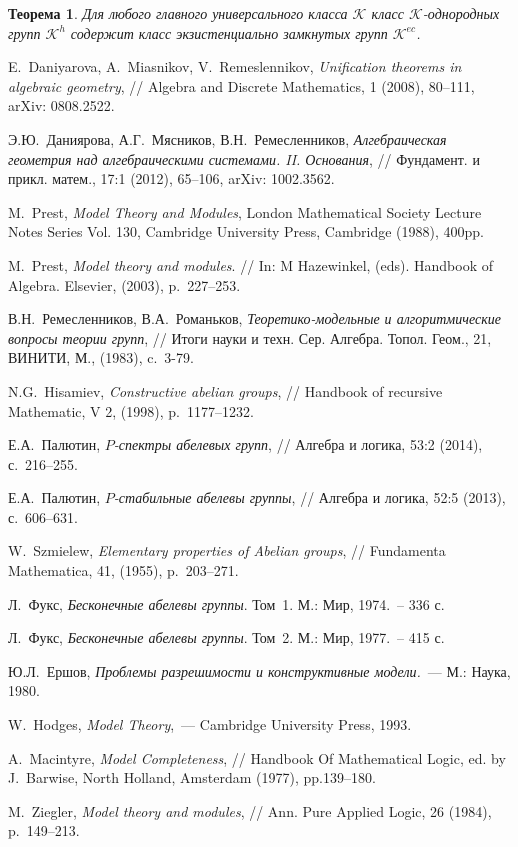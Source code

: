 \documentclass[12pt]{extarticle} %
\newtheorem{theorem}{Теорема}[section]
\def\K{{\mathcal{K}}}
\def\Kec{\mathcal{K}^{ec}}
\def\Kh{\mathcal{K}^{h}}
\begin{document}
\begin{theorem}
Для любого главного универсального класса $\K$ класс $\K$-однородных групп $\Kh$ содержит класс экзистенциально замкнутых групп $\Kec$.
\end{theorem}




%
%
\begin{thebibliography}{99}

 E.~Daniyarova, A.~Miasnikov, V.~Remeslennikov, \textit{Unification theorems in algebraic geometry}, // Algebra and Discrete Mathematics, 1 (2008), 80--111, arXiv: 0808.2522.

 Э.Ю.~Даниярова, А.Г.~Мясников, В.Н.~Ремесленников, \textit{Алгебраическая геометрия над алгебраическими системами. II. Основания}, // Фундамент. и прикл. матем., 17:1 (2012), 65--106, arXiv: 1002.3562.

 M.~Prest, \textit{Model Theory and Modules}, London Mathematical Society Lecture Notes Series Vol. 130, Cambridge University Press, Cambridge (1988), 400pp.

 M.~Prest, \textit{Model theory and modules}. // In: M Hazewinkel, (eds). Handbook of Algebra. Elsevier, (2003), p.~227--253. 

 В.Н.~Ремесленников, В.А.~Романьков, \textit{Теоретико-модельные и алгоритмические вопросы теории групп}, // Итоги науки и техн. Сер. Алгебра. Топол. Геом., 21, ВИНИТИ, М., (1983), c.~3-79. 

 N.G.~Hisamiev, \textit{Constructive abelian groups}, // Handbook of recursive Mathematic, V 2, (1998), p.~1177--1232.

 Е.А.~Палютин, \textit{$P$-спектры абелевых групп}, // Алгебра и логика, 53:2 (2014), с.~216--255.

 Е.А.~Палютин, \textit{$P$-стабильные абелевы группы}, // Алгебра и логика, 52:5 (2013), с.~606--631.

 W.~Szmielew, \textit{Elementary properties of Abelian groups}, // Fundamenta Mathematica, 41, (1955), p.~203--271.

 Л.~Фукс, \textit{Бесконечные абелевы группы}. Том~1. М.: Мир, 1974.~-- 336 с.

 Л.~Фукс, \textit{Бесконечные абелевы группы}. Том~2. М.: Мир, 1977.~-- 415 с.

 Ю.Л.~Ершов, \textit{Проблемы разрешимости и конструктивные модели.}~--- М.: Наука, 1980.

 W.~Hodges, \textit{Model Theory},~--- Cambridge University Press, 1993. 

 A.~Macintyre, \textit{Model Completeness}, // Handbook Of Mathematical Logic, ed. by J.~Barwise, North Holland, Amsterdam (1977), pp.139--180.

 M.~Ziegler, \textit{Model theory and modules}, // Ann. Pure Applied Logic, 26 (1984), p.~149--213.

\end{thebibliography}


% 
% 
\end{document}
